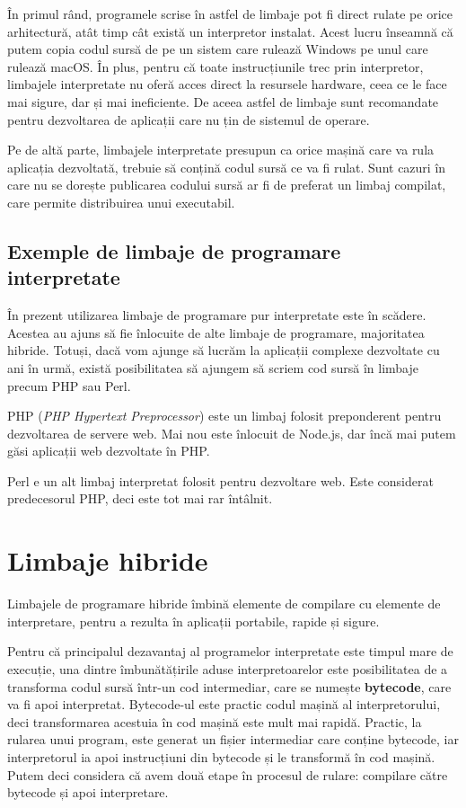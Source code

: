În primul rând, programele scrise în astfel de limbaje pot fi direct rulate pe
orice arhitectură, atât timp cât există un interpretor instalat. Acest lucru înseamnă
că putem copia codul sursă de pe un sistem care rulează Windows pe unul care
rulează macOS. În plus, pentru că toate instrucțiunile trec prin interpretor,
limbajele interpretate nu oferă acces direct la resursele hardware, ceea ce le
face mai sigure, dar și mai ineficiente. De aceea astfel de limbaje sunt
recomandate pentru dezvoltarea de aplicații care nu țin de sistemul de operare.

Pe de altă parte, limbajele interpretate presupun ca orice mașină care va rula
aplicația dezvoltată, trebuie să conțină codul sursă ce va fi rulat. Sunt cazuri
în care nu se dorește publicarea codului sursă ar fi de preferat un limbaj
compilat, care permite distribuirea unui executabil.

\subsection{Exemple de limbaje de programare interpretate}
\label{sec:appdev:interpreted-lang:ex}

În prezent utilizarea limbaje de programare pur interpretate este în scădere.
Acestea au ajuns să fie înlocuite de alte limbaje de programare, majoritatea
hibride. Totuși, dacă vom ajunge să lucrăm la aplicații complexe dezvoltate cu
ani în urmă, există posibilitatea să ajungem să scriem cod sursă în limbaje
precum PHP sau Perl.

PHP  (\textit{PHP Hypertext Preprocessor}) este un limbaj folosit preponderent pentru dezvoltarea de servere web. Mai
nou este înlocuit de Node.js, dar încă mai putem găsi aplicații web dezvoltate
în PHP.

Perl e un alt limbaj interpretat folosit pentru dezvoltare web. Este considerat
predecesorul PHP, deci este tot mai rar întâlnit.

\section{Limbaje hibride}
\label{sec:appdev:hybrid-lang}

Limbajele de programare hibride îmbină elemente de compilare cu elemente de
interpretare, pentru a rezulta în aplicații portabile, rapide și sigure.

Pentru că principalul dezavantaj al programelor interpretate este timpul mare de
execuție, una dintre îmbunătățirile aduse interpretoarelor este posibilitatea de a
transforma codul sursă într-un cod intermediar, care se numește \textbf{bytecode}, care
va fi apoi interpretat. Bytecode-ul este practic codul mașină al
interpretorului, deci transformarea acestuia în cod mașină este mult mai rapidă.
Practic, la rularea unui program, este generat un fișier intermediar care
conține bytecode, iar interpretorul ia apoi instrucțiuni din bytecode și le
transformă în cod mașină. Putem deci considera că avem două etape în procesul de
rulare: compilare către bytecode și apoi interpretare.

